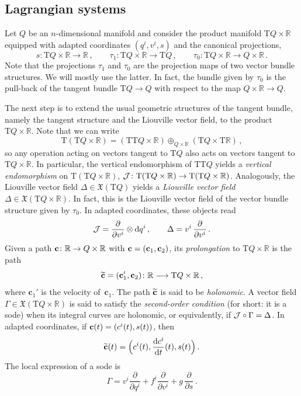 \documentclass[11pt]{article}
\theoremstyle{plain}
\theoremstyle{definition}
\newcommand{\R}{\mathbb{R}}
\renewcommand{\d}{\mathrm{d}}
\newcommand{\T}{{\mathrm T}}
\let\Tan\T
\newcommand{\vf}{\mathfrak{X}}
\newcommand{\X}{\mathfrak{X}}
\def\d{\mathrm{d}}
\def\X{\mathfrak{X}}
\def\d{\mathrm{d}}
\def\Tan{\mathrm{T}}
\begin{document}
\subsection{Lagrangian systems}

Let $Q$ be an $n$-dimensional manifold and consider the product manifold 
$\T Q\times\R$ equipped with adapted coordinates $(q^i,v^i, s)$ and the canonical projections,
$$ s\colon \T Q\times\R\to\R \,, \qquad \tau_1\colon \T Q\times\R\to\T Q\,, \qquad \tau_0\colon \T Q\times\R\to Q\times\R\,. $$
Note that the projections $\tau_1$ and $\tau_0$ are the projection maps of two vector bundle structures. We will mostly use the latter. In fact, the bundle given by $\tau_0$ is the pull-back of the tangent bundle $\T Q\to Q$ with respect to the map $Q \times \R \to Q$.

The next step is to extend the usual geometric structures of the tangent bundle, namely the tangent structure and the Liouville vector field, to the product $\T Q\times\R$. Note that we can write
$$ \T(\T Q \times \R) = (\T\T Q \times \R) \oplus_{Q\times\R} (\T Q \times \T\R)\,, $$
so any operation acting on vectors tangent to $\T Q$ also acts on vectors tangent to $\T Q \times \R$. In particular, the vertical endomorphism of $\T\T Q$ yields a \textsl{vertical endomorphism} on $\Tan(\Tan Q \times \R)$, ${\cal J} \colon \T (\T Q\times\R) \to \T (\T Q\times\R)$. Analogously, the Liouville vector field $\Delta\in\X(\T Q)$ yields a \textsl{Liouville vector field} $\Delta\in\vf(\T Q\times\R)$. In fact, this is the Liouville vector field of the vector bundle structure given by $\tau_0$. In adapted coordinates, these objects read
$$ {\cal J} = \frac{\partial}{\partial v^i} \otimes \d q^i \,,\qquad \Delta = v^i\, \frac{\partial}{\partial v^i}\,. $$
Given a path ${\bf c} \colon\R \rightarrow Q\times\R$ with ${\bf c} = (\mathbf{c}_1,\mathbf{c}_2)$, its \textsl{prolongation} to $\T Q\times\R$ is the path
$$ {\bf \widetilde c} = (\mathbf{c}_1',\mathbf{c}_2) \colon \R \longrightarrow \T Q \times \R \,, $$
where $\mathbf{c}_1'$ is the velocity of~$\mathbf{c}_1$. The path ${\bf \widetilde c}$ is said to be \textsl{holonomic}. A vector field $\Gamma \in \X(\T Q \times \R)$ is said to satisfy the \textsl{second-order condition} (for short: it is a {\sc sode}) when its integral curves are holonomic, or equivalently, if ${\cal J} \circ \Gamma = \Delta$. In adapted coordinates, if ${\bf c}(t)=(c^i(t), s(t))$, then
$$ {\bf \widetilde c}(t) = \Big( c^i(t),\frac{\d c^i}{\d t}(t), s(t) \Big) \,. $$
The local expression of a {\sc sode} is
\begin{equation}
\label{localsode2}
\Gamma= 
v^i \frac{\partial}{\partial q^i} +
f^i \frac{\partial}{\partial v^i} + 
g\,\frac{\partial}{\partial s}
\,.
\end{equation}
\end{document}
